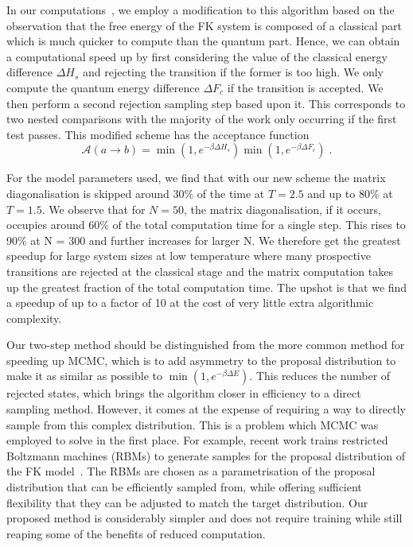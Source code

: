 In our computations~\autocite{hodsonMCMCFKModel2021}, we employ a modification to this algorithm based on the observation that the free energy of the FK system is composed of a classical part which is much quicker to compute than the quantum part. Hence, we can obtain a computational speed up by first considering the value of the classical energy difference \(\Delta H_s\) and rejecting the transition if the former is too high. We only compute the quantum energy difference \(\Delta F_c\) if the transition is accepted. We then perform a second rejection sampling step based upon it. This corresponds to two nested comparisons with the majority of the work only occurring if the first test passes. This modified scheme has the acceptance function \[\mathcal{A}(a \to b) = \min\left(1, e^{-\beta \Delta H_s}\right)\min\left(1, e^{-\beta \Delta F_c}\right)\;.\]

For the model parameters used, we find that with our new scheme the matrix diagonalisation is skipped around 30\% of the time at \(T = 2.5\) and up to 80\% at \(T = 1.5\). We observe that for \(N = 50\), the matrix diagonalisation, if it occurs, occupies around 60\% of the total computation time for a single step. This rises to 90\% at N = 300 and further increases for larger N. We therefore get the greatest speedup for large system sizes at low temperature where many prospective transitions are rejected at the classical stage and the matrix computation takes up the greatest fraction of the total computation time. The upshot is that we find a speedup of up to a factor of 10 at the cost of very little extra algorithmic complexity.

Our two-step method should be distinguished from the more common method for speeding up MCMC, which is to add asymmetry to the proposal distribution to make it as similar as possible to \(\min\left(1, e^{-\beta \Delta E}\right)\). This reduces the number of rejected states, which brings the algorithm closer in efficiency to a direct sampling method. However, it comes at the expense of requiring a way to directly sample from this complex distribution. This is a problem which MCMC was employed to solve in the first place. For example, recent work trains restricted Boltzmann machines (RBMs) to generate samples for the proposal distribution of the FK model~\autocite{huangAcceleratedMonteCarlo2017}. The RBMs are chosen as a parametrisation of the proposal distribution that can be efficiently sampled from, while offering sufficient flexibility that they can be adjusted to match the target distribution. Our proposed method is considerably simpler and does not require training while still reaping some of the benefits of reduced computation.

